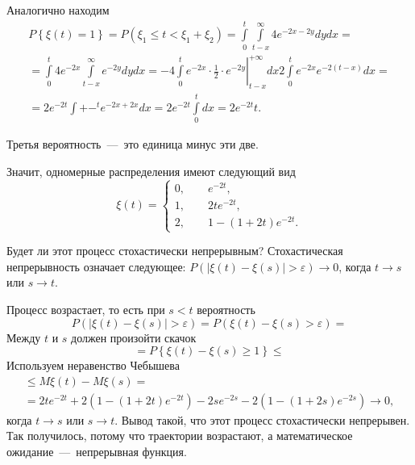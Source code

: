 Аналогично находим
\begin{gather*}
  P \left\{ \xi \left( t \right) = 1 \right\} =
  P \left( \xi_1 \leq t < \xi_1 + \xi_2 \right) =
  \int \limits_0^t \int \limits_{t - x}^{ \infty } 4e^{-2x - 2y} dydx = \\
  = \int \limits_0^t 4e^{-2x} \int \limits_{t - x}^{ \infty } e^{-2y} dydx =
  \left.
    -4 \int \limits_0^t e^{-2x} \cdot \frac{1}{2} \cdot e^{-2y}
  \right|_{t - x}^{+\infty } dx
  2 \int \limits_0^t e^{-2x} e^{-2 \left( t - x \right) } dx = \\
  = 2e^{-2t} \int \limits+-^t e^{-2x + 2x} dx =
  2e^{-2t} \int \limits_0^t dx =
  2e^{-2t}t.
\end{gather*}

Третья вероятность~---~это единица минус эти две.

Значит, одномерные распределения имеют следующий вид
\begin{equation*}
  \xi \left( t \right) =
  \begin{cases}
    0, \qquad e^{-2t}, \\
    1, \qquad 2te^{-2t}, \\
    2, \qquad 1 - \left( 1 + 2t \right) e^{-2t}.
  \end{cases}
\end{equation*}

Будет ли этот процесс стохастически непрерывным?
Стохастическая непрерывность означает следующее:
$P \left(
    \left| \xi \left( t \right) - \xi \left( s \right) \right| > \varepsilon
  \right) \to 0$,
когда $t \to s$ или $s \to t$.

Процесс возрастает, то есть при $s < t$ вероятность
\begin{equation*}
  P \left(
    \left| \xi \left( t \right) - \xi \left( s \right) \right| > \varepsilon
  \right) =
  P \left( \xi \left( t \right) - \xi \left( s \right) > \varepsilon \right) =
\end{equation*}
Между $t$ и $s$ должен произойти скачок
\begin{equation*}
  = P \left\{ \xi \left( t \right) - \xi \left( s \right) \geq 1 \right\} \leq
\end{equation*}
Используем неравенство Чебышева
\begin{gather*}
  \leq M \xi \left( t \right) - M \xi \left( s \right) = \\
  = 2te^{-2t} + 2 \left( 1 - \left( 1 + 2t \right) e^{-2t} \right) -2se^{-2s} -
  2 \left( 1 - \left( 1 + 2s \right) e^{-2s} \right) \to
  0,
\end{gather*}
когда $t \to s$ или $s \to t$.
Вывод такой, что этот процесс стохастически непрерывен.
Так получилось, потому что траектории возрастают,
а математическое ожидание~---~непрерывная функция.

